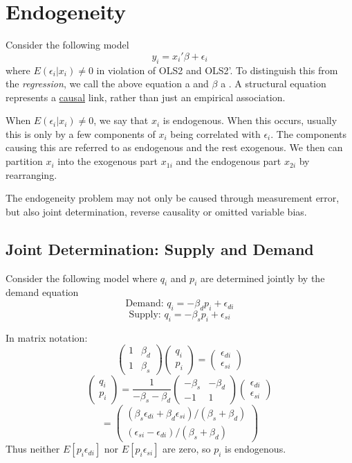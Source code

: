 \documentclass[DIV=14,titlepage=false]{scrreprt}
\begin{document}
\section{Endogeneity}

Consider the following model
\[y_i=x_i'\beta+\epsilon_i\]
where \(E(\epsilon_i|x_i)\neq0\) in violation of OLS2 and OLS2'.
To distinguish this from the \textit{regression}, we call the above equation a \underline{} and \(\beta\) a \underline{}.
A structural equation represents a \underline{causal} link, rather than just an empirical association.

When \(E(\epsilon_i|x_i)\neq0\), we say that \(x_i\) is endogenous. When this occurs, usually this is only by a few components of \(x_i\) being correlated with \(\epsilon_i\). The components causing this are referred to as endogenous and the rest exogenous.
We then can partition \(x_i\) into the exogenous part \(x_{1i}\) and the endogenous part \(x_{2i}\) by rearranging.

The endogeneity problem may not only be caused through measurement error, but also joint determination, reverse causality or omitted variable bias.

\subsection{Joint Determination: Supply and Demand}
Consider the following model where \(q_i\) and \(p_i\) are determined jointly by the demand equation
\[\text{Demand: }q_i=-\beta_dp_i+\epsilon_{di}\]
\[\text{Supply: }q_i=-\beta_sp_i+\epsilon_{si}\]

In matrix notation:
\[\begin{pmatrix} 1 & \beta_d \\ 1 & \beta_s \end{pmatrix} \begin{pmatrix} q_i \\ p_i \end{pmatrix} = \begin{pmatrix} \epsilon_{di} \\ \epsilon_{si} \end{pmatrix}\]
\[\begin{pmatrix} q_i \\ p_i \end{pmatrix} = \frac{1}{-\beta_s-\beta_d} \begin{pmatrix} -\beta_s & -\beta_d \\ -1 & 1 \end{pmatrix} \begin{pmatrix} \epsilon_{di} \\ \epsilon_{si} \end{pmatrix}\]
\[=\begin{pmatrix} (\beta_s\epsilon_{di}+\beta_d\epsilon_{si})/(\beta_s+\beta_d) \\ (\epsilon_{si}-\epsilon_{di})/(\beta_s+\beta_d) \end{pmatrix}\]
Thus neither \(E[p_i\epsilon_{di}]\) nor \(E[p_i\epsilon_{si}]\) are zero, so \(p_i\) is endogenous.
\end{document}
